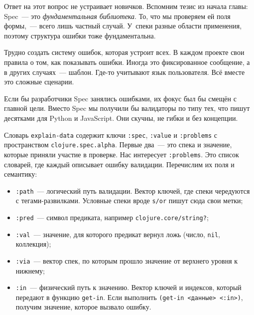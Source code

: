 
Ответ на этот вопрос не устраивает новичков. Вспомним тезис из начала главы:
Spec~--- это \emph{фундаментальная библиотека}. То, что мы проверяем ей поля
формы,~--- всего лишь частный случай. У~спеки разные области применения, поэтому
структура ошибки тоже фундаментальна.

Трудно создать систему ошибок, которая устроит всех. В каждом проекте свои
правила о том, как показывать ошибки. Иногда это фиксированное сообщение, а в
других случаях~--- шаблон. Где-то учитывают язык пользователя. Всё вместе это
сложные сценарии.

Если бы разработчики Spec занялись ошибками, их фокус был бы смещён с главной
цели. Вместо Spec мы получили бы валидаторы по типу тех, что пишут десятками для
Python и JavaScript. Они скучны, не гибки и без концепции.

Словарь \verb|explain-data| содержит ключи \verb|:spec|, \verb|:value| и
\verb|:problems| с пространством \verb|clojure.spec.alpha|. Первые два~--- это
спека и значение, которые приняли участие в проверке. Нас интересует
\verb|:problems|. Это список словарей, где каждый описывает ошибку
валидации. Перечислим их поля и семантику:


\begin{itemize}

\item
  \verb|:path|~--- логический путь валидации. Вектор ключей, где спеки
  чередуются с тегами-развилками. Условные спеки вроде \verb|s/or| пишут сюда
  свои метки;

\item
  \verb|:pred|~--- символ предиката, например \texttt{clo\-ju\-re.\-core/\-string?};

\item
  \verb|:val|~--- значение, для которого предикат вернул ложь (число,
  \verb|nil|, коллекция);

\item
  \verb|:via|~--- вектор спек, по которым прошло значение от верхнего уровня к
  нижнему;

\item
  \verb|:in|~--- физический путь к значению. Вектор ключей и индексов, который
  передают в функцию \verb|get-in|. Если выполнить \verb|(get-in <данные> <:in>)|,
  получим значение, которое вызвало ошибку.

\end{itemize}

